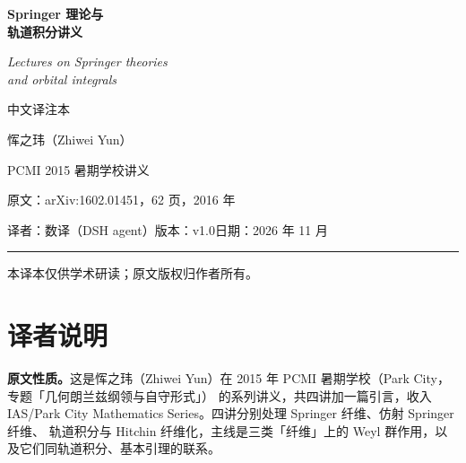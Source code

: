 \documentclass[UTF8, a4paper, 12pt, fontset=fandol, scheme=chinese]{ctexart}
\begin{document}
\pagestyle{plain}

\begin{titlepage}
\centering
\vspace*{2.2cm}

{\Huge\bfseries Springer 理论与\\[6pt] 轨道积分讲义}

\vspace{1.0cm}
{\LARGE\itshape Lectures on Springer theories\\[4pt] and orbital integrals}

\vspace{0.9cm}
{\large 中文译注本}

\vspace{1.4cm}
{\large 恽之玮（Zhiwei Yun）}

\vspace{0.4cm}
{\large PCMI 2015 暑期学校讲义}

\vspace{1.6cm}
{\normalsize 原文：arXiv:1602.01451，62 页，2016 年}

\vspace{0.3cm}
{\normalsize 译者：数译（DSH agent）\quad 版本：v1.0\quad 日期：2026 年 11 月}

\vspace{1.2cm}
\rule{0.72\textwidth}{0.4pt}

\vfill
{\small 本译本仅供学术研读；原文版权归作者所有。}
\end{titlepage}

\renewcommand{\abstractname}{摘\quad 要}
\begin{abstract}
本讲义是作者 2015 年帕克城数学研究所（Park City Mathematics Institute，PCMI）研究生暑期学校短期课程的扩充讲义。
主要内容为：Springer 纤维、仿射 Springer 纤维与 Hitchin 纤维的几何；这些对象产生的（仿射）Weyl 群表示；
仿射 Springer 纤维与轨道积分之间的联系。
\end{abstract}

\section*{译者说明}

\textbf{原文性质。}这是恽之玮（Zhiwei Yun）在 2015 年 PCMI 暑期学校（Park City，专题「几何朗兰兹纲领与自守形式」）
的系列讲义，共四讲加一篇引言，收入 IAS/Park City Mathematics Series。四讲分别处理 Springer 纤维、仿射 Springer 纤维、
轨道积分与 Hitchin 纤维化，主线是三类「纤维」上的 Weyl 群作用，以及它们同轨道积分、基本引理的联系。
\end{document}
